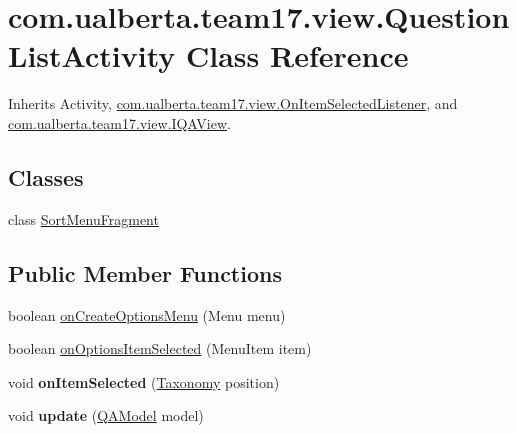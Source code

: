 \hypertarget{classcom_1_1ualberta_1_1team17_1_1view_1_1_question_list_activity}{\section{com.\+ualberta.\+team17.\+view.\+Question\+List\+Activity Class Reference}
\label{classcom_1_1ualberta_1_1team17_1_1view_1_1_question_list_activity}
}


Inherits Activity, \hyperlink{interfacecom_1_1ualberta_1_1team17_1_1view_1_1_on_item_selected_listener}{com.\+ualberta.\+team17.\+view.\+On\+Item\+Selected\+Listener}, and \hyperlink{interfacecom_1_1ualberta_1_1team17_1_1view_1_1_i_q_a_view}{com.\+ualberta.\+team17.\+view.\+I\+Q\+A\+View}.

\subsection*{Classes}
\begin{DoxyCompactItemize}
\item 
class \hyperlink{classcom_1_1ualberta_1_1team17_1_1view_1_1_question_list_activity_1_1_sort_menu_fragment}{Sort\+Menu\+Fragment}
\end{DoxyCompactItemize}
\subsection*{Public Member Functions}
\begin{DoxyCompactItemize}
\item 
boolean \hyperlink{classcom_1_1ualberta_1_1team17_1_1view_1_1_question_list_activity_a4bc38f204e00b42094ec82ad3fda1ea4}{on\+Create\+Options\+Menu} (Menu menu)
\item 
boolean \hyperlink{classcom_1_1ualberta_1_1team17_1_1view_1_1_question_list_activity_a07e0d04a9438127ae397906c792c584f}{on\+Options\+Item\+Selected} (Menu\+Item item)
\item 
\hypertarget{classcom_1_1ualberta_1_1team17_1_1view_1_1_question_list_activity_a995f61fcc138fd5cab78157c4a38a662}{void {\bfseries on\+Item\+Selected} (\hyperlink{enumcom_1_1ualberta_1_1team17_1_1view_1_1_list_fragment_1_1_taxonomy}{Taxonomy} position)}\label{classcom_1_1ualberta_1_1team17_1_1view_1_1_question_list_activity_a995f61fcc138fd5cab78157c4a38a662}

\item 
\hypertarget{classcom_1_1ualberta_1_1team17_1_1view_1_1_question_list_activity_aeaede3abed5877db3b64840af90c0516}{void {\bfseries update} (\hyperlink{classcom_1_1ualberta_1_1team17_1_1_q_a_model}{Q\+A\+Model} model)}\label{classcom_1_1ualberta_1_1team17_1_1view_1_1_question_list_activity_aeaede3abed5877db3b64840af90c0516}

\end{DoxyCompactItemize}
